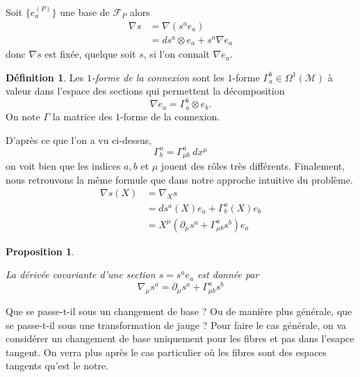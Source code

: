 \documentclass[a4paper,11pt]{report}
\theoremstyle{definition}
\theoremstyle{plain}
\newtheorem{prop}[thm]{Proposition}
\theoremstyle{definition}
\newtheorem{defn}{Définition}[chapter]
\theoremstyle{remark}
\newcommand{\M}{\mathscr{M}}
\newcommand{\F}{\mathcal{F}}
\newcommand{\p}{\partial}
\begin{document}
                Soit $\{e_a^{(P)}\}$ une base de $\F_P$ alors
                \begin{align}
                    \nabla s &= \nabla(s^a e_a)\\
                    &= ds^a\otimes e_a+s^a\nabla e_a
                \end{align}
            donc $\nabla s$ est fixée, quelque soit $s$, si l'on connaît $\nabla e_a$. 
            \begin{defn}
                Les \textit{$1$-forme de la connexion} sont les  $1$-forme $\Gamma^b_a\in\Omega^1(\M)$ à valeur dans l'espace des sections qui permettent la décomposition
                \begin{equation}
                    \nabla e_a = \Gamma^b_a \otimes e_b.
                \end{equation}
                On note $\Gamma$ la matrice des $1$-forme de la connexion.
             \end{defn}
             
            D'après ce que l'on a vu ci-dessus,
            \begin{equation}
                 \Gamma^a_b = \Gamma^a_{\mu b}~dx^\mu
            \end{equation}
            on voit bien que les indices $a,b$ et $\mu$ jouent des rôles très différents. Finalement, nous retrouvons la même formule que dans notre approche intuitive du problème.
            \begin{align}
                 \nabla s(X) &= \nabla_X s\\
                 &= ds^a(X)e_a+\Gamma^a_b(X)e_b\\
                 &= X^\mu(\p_\mu s^a+\Gamma^a_{\mu b}s^b)e_a
            \end{align}
             
            \begin{prop}\begin{leftbar}
                    La dérivée covariante d'une section $s = s^a e_a$ est donnée par
                    \begin{equation}
                        \nabla_\mu s^a = \p_\mu s^a+\Gamma^a_{\mu b}s^b
                    \end{equation}
            \end{leftbar}\end{prop}
             
            Que se passe-t-il sous un changement de base ? Ou de manière plus générale, que se passe-t-il sous une transformation de jauge ? Pour faire le cas générale, on va considérer un changement de base uniquement pour les fibres et pas dans l'esapce tangent. On verra plus après le cas particulier où les fibres sont des espaces tangents qu'est le notre.
            
\end{document}
